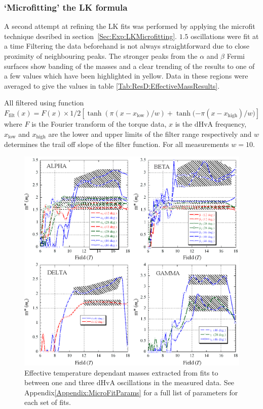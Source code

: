 \subsubsection{`Microfitting' the LK formula}

A second attempt at refining the LK fits was performed by applying the microfit technique desribed in section~\ref{Sec:Exp:LKMicrofitting}. $1.5$ oscillations were fit at a time Filtering the data beforehand is not always straightforward due to close proximity of neighbouring peaks. The stronger peaks from the $\alpha$ and $\beta$ Fermi surfaces show banding of the masses and a clear trending of the results to one of a few values which have been highlighted in yellow. Data in these regions were averaged to give the values in table \ref{Tab:ResD:EffectiveMassResults}.

All filtered using function $\textit{F}_{\textrm{filt}}(x) = \textit{F}(x) \times 1/2 [\tanh{(\pi(x - x_{\textrm{low}})/w)} + \tanh{(-\pi(x - x_{\textrm{high}})/w})]$ where $\textit{F}$ is the Fourier transform of the torque data, $x$ is the dHvA frequency, $x_{\textrm{low}}$ and $x_{\textrm{high}}$ are the lower and upper limits of the filter range respectively and $w$ determines the trail off slope of the filter function. For all measurements $w=10$.
\begin{figure}[htbp]
    \begin{center}
        \includegraphics[scale=0.7]{Chapter-dHvABaFe2P2/Figures/Mass/MicroFits/MicroFits}
        \caption{Effective temperature dependant masses extracted from fits to between one and three dHvA oscillations in the measured data. See Appendix\ref{Appendix:MicroFitParams} for a full list of parameters for each set of fits.}
        \label{Fig:ResD:MicroFits}
    \end{center}
\end{figure}
